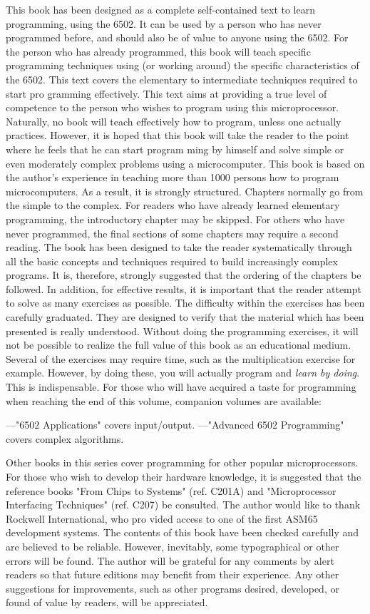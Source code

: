\documentclass{book}
\begin{document}
This book has been designed as a complete self-contained text to learn programming, using the 6502. It can be used by a person who has never programmed before, and should also be of value to anyone using the 6502.
For the person who has already programmed, this book will teach specific programming techniques using (or working around) the specific characteristics of the 6502. This text covers the elementary to intermediate techniques required to start pro gramming effectively.
This text aims at providing a true level of competence to the person who wishes to program using this microprocessor. Naturally, no book will teach effectively how to program, unless one actually practices. However, it is hoped that this book will take the reader to the point where he feels that he can start program ming by himself and solve simple or even moderately complex problems using a microcomputer.
This book is based on the author's experience in teaching more than 1000 persons how to program microcomputers. As a result, it is strongly structured. Chapters normally go from the simple to the complex. For readers who have already learned elementary programming, the introductory chapter may be skipped. For others who have never programmed, the final sections of some chapters may require a second reading. The book has been designed to take the reader systematically through all the basic concepts and techniques required to build increasingly complex programs. It is, therefore, strongly suggested that the ordering of the chapters be followed. In addition, for effective results, it is important that the reader attempt to solve as many exercises as possible. The difficulty within the exercises has been carefully graduated. They are designed to verify that the material which has been presented is really understood. Without doing the programming exercises, it will not be possible to realize the full value of this book as an educational medium. Several of the exercises may require time, such as the multiplication exercise for example. However, by doing these, you will actually program and \textit{learn by doing}. This is indispensable.
For those who will have acquired a taste for programming when reaching the end of this volume, companion volumes are available:

—"6502 Applications" covers input/output.
—"Advanced 6502 Programming" covers complex algorithms.

Other books in this series cover programming for other popular microprocessors.
For those who wish to develop their hardware knowledge, it is suggested that the reference books "From Chips to Systems" (ref. C201A) and "Microprocessor Interfacing Techniques" (ref. C207) be consulted.
The author would like to thank Rockwell International, who pro vided access to one of the first ASM65 development systems.
The contents of this book have been checked carefully and are believed to be reliable. However, inevitably, some typographical or other errors will be found. The author will be grateful for any comments by alert readers so that future editions may benefit from their experience. Any other suggestions for improvements, such as other programs desired, developed, or found of value by readers, will be appreciated.
\end{document}
